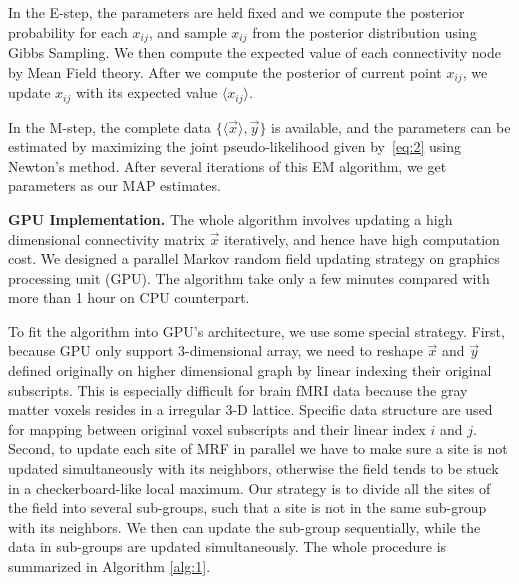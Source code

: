 \documentclass[runningheads,a4paper]{llncs}
\begin{document}
In the E-step, the parameters are held fixed and we compute the posterior
probability for each $x_{ij}$, and sample $x_{ij}$ from the posterior
distribution using Gibbs Sampling. We then compute the expected value of each
connectivity node by Mean Field theory. After we compute the posterior of
current point $x_{ij}$, we update $x_{ij}$ with its expected value $\langle
x_{ij} \rangle$.

In the M-step, the complete data $\{\langle\vec x\rangle, \vec y\}$ is
available, and the parameters can be estimated by maximizing the joint
pseudo-likelihood given by~\eqref{eq:2} using Newton's method. After several
iterations of this EM algorithm, we get parameters as our MAP estimates.

{\bf GPU Implementation.} The whole algorithm involves updating a high
dimensional connectivity matrix $\vec x$ iteratively, and hence have high
computation cost. We designed a parallel Markov random field updating strategy
on graphics processing unit (GPU). The algorithm take only a few minutes
compared with more than 1 hour on CPU counterpart.

To fit the algorithm into GPU's architecture, we use some special
strategy. First, because GPU only support 3-dimensional array, we need
to reshape $\vec x$ and $\vec y$ defined originally on higher
dimensional graph by linear indexing their original subscripts. This
is especially difficult for brain fMRI data because the gray matter
voxels resides in a irregular 3-D lattice. Specific data structure are
used for mapping between original voxel subscripts and their linear
index $i$ and $j$. Second, to update each site of MRF in parallel we
have to make sure a site is not updated simultaneously with its
neighbors, otherwise the field tends to be stuck in a
checkerboard-like local maximum. Our strategy is to divide all the
sites of the field into several sub-groups, such that a site is not in
the same sub-group with its neighbors.  We then can update the
sub-group sequentially, while the data in sub-groups are updated
simultaneously. The whole procedure is summarized in Algorithm \ref{alg:1}.
\end{document}
